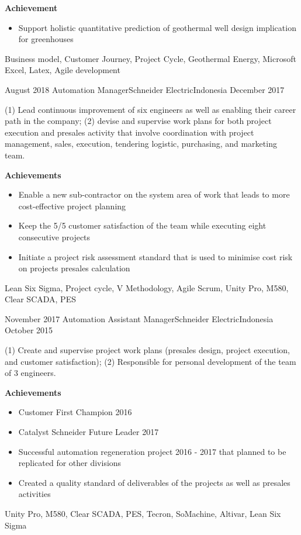 \begin{experiences}
{\textbf{Achievement} 
                      \begin{itemize}
                        \item Support holistic quantitative prediction of geothermal well design implication for greenhouses
                        
                      \end{itemize}
                    }
                    {Business model, Customer Journey, Project Cycle, Geothermal Energy, Microsoft Excel, Latex, Agile development}
  \emptySeparator
  
  
      \experience
    {August 2018}     {Automation Manager}{Schneider Electric}{Indonesia}
    {December 2017} { (1) Lead continuous improvement of six engineers as well as enabling their career path in the company; (2) devise and supervise work plans for both project execution and presales activity that involve coordination with project management, sales, execution, tendering logistic, purchasing, and marketing team.
    
\textbf{Achievements} 
                      \begin{itemize}
                        \item Enable a new sub-contractor on the system area of work that leads to more cost-effective project planning
                        \item Keep the 5/5 customer satisfaction of the team while executing eight consecutive projects
                        \item Initiate a project risk assessment standard that is used to minimise cost risk on projects presales calculation
                      \end{itemize}
                    }
                    {Lean Six Sigma, Project cycle, V Methodology, Agile Scrum, Unity Pro, M580, Clear SCADA, PES}
  
        \experience
    {November 2017}     {Automation Assistant Manager}{Schneider Electric}{Indonesia}
    {October 2015} { (1) Create and supervise project work plans (presales design, project execution, and customer satisfaction); (2) Responsible for personal development of the team of 3 engineers.
    
\textbf{Achievements} 
                      \begin{itemize}
                        \item Customer First Champion 2016
                        \item Catalyst Schneider Future Leader 2017
                        \item Successful automation regeneration project 2016 - 2017 that planned to be replicated for other divisions
                        \item Created a quality standard of deliverables of the projects as well as presales activities
                      \end{itemize}
                    }
                    {Unity Pro, M580, Clear SCADA, PES, Tecron, SoMachine, Altivar, Lean Six Sigma}
  

\end{experiences}
